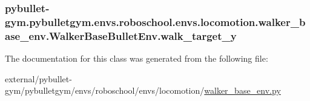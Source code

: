 \subsubsection[{\texorpdfstring{walk\+\_\+target\+\_\+y}{walk_target_y}}]{\setlength{\rightskip}{0pt plus 5cm}pybullet-\/gym.\+pybulletgym.\+envs.\+roboschool.\+envs.\+locomotion.\+walker\+\_\+base\+\_\+env.\+Walker\+Base\+Bullet\+Env.\+walk\+\_\+target\+\_\+y}\hypertarget{classpybullet-gym_1_1pybulletgym_1_1envs_1_1roboschool_1_1envs_1_1locomotion_1_1walker__base__env_1_1_walker_base_bullet_env_a319b4ae2a286c533800127c4faa69e78}{}\label{classpybullet-gym_1_1pybulletgym_1_1envs_1_1roboschool_1_1envs_1_1locomotion_1_1walker__base__env_1_1_walker_base_bullet_env_a319b4ae2a286c533800127c4faa69e78}


The documentation for this class was generated from the following file\+:\begin{DoxyCompactItemize}
\item 
external/pybullet-\/gym/pybulletgym/envs/roboschool/envs/locomotion/\hyperlink{roboschool_2envs_2locomotion_2walker__base__env_8py}{walker\+\_\+base\+\_\+env.\+py}\end{DoxyCompactItemize}

